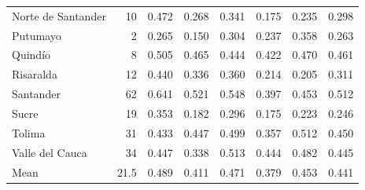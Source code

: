 \documentclass[11pt,a4paper,oneside]{article}
\begin{document}
\begin{table}[htbp]
\begin{tabular}{lrrrrrrr}
    Norte de Santander & 10    & 0.472 & 0.268 & 0.341 & 0.175 & 0.235 & 0.298 \\
    Putumayo & 2     & 0.265 & 0.150 & 0.304 & 0.237 & 0.358 & 0.263 \\
    Quind\'io & 8     & 0.505 & 0.465 & 0.444 & 0.422 & 0.470 & 0.461 \\
    Risaralda & 12    & 0.440 & 0.336 & 0.360 & 0.214 & 0.205 & 0.311 \\
    Santander & 62    & 0.641 & 0.521 & 0.548 & 0.397 & 0.453 & 0.512 \\
    Sucre & 19    & 0.353 & 0.182 & 0.296 & 0.175 & 0.223 & 0.246 \\
    Tolima & 31    & 0.433 & 0.447 & 0.499 & 0.357 & 0.512 & 0.450 \\
    Valle del Cauca & 34    & 0.447 & 0.338 & 0.513 & 0.444 & 0.482 & 0.445 \\
    \midrule
    Mean  & 21.5  & 0.489 & 0.411 & 0.471 & 0.379 & 0.453 & 0.441 \\
    \bottomrule
    \end{tabular}
  \label{tab:eff_scores_departments}
\end{table}

\vspace*{\fill}



\vspace*{\fill}
\end{document}
